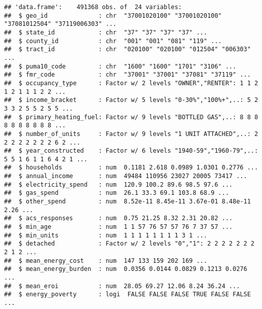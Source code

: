 \documentclass[]{article}
\begin{document}
\begin{verbatim}
## 'data.frame':    491368 obs. of  24 variables:
##  $ geo_id              : chr  "37001020100" "37001020100" "37081012504" "37119006303" ...
##  $ state_id            : chr  "37" "37" "37" "37" ...
##  $ county_id           : chr  "001" "001" "081" "119" ...
##  $ tract_id            : chr  "020100" "020100" "012504" "006303" ...
##  $ puma10_code         : chr  "1600" "1600" "1701" "3106" ...
##  $ fmr_code            : chr  "37001" "37001" "37081" "37119" ...
##  $ occupancy_type      : Factor w/ 2 levels "OWNER","RENTER": 1 1 2 1 2 1 1 1 2 2 ...
##  $ income_bracket      : Factor w/ 5 levels "0-30%","100%+",..: 5 2 3 3 2 5 5 2 5 5 ...
##  $ primary_heating_fuel: Factor w/ 9 levels "BOTTLED GAS",..: 8 8 8 8 8 8 8 8 8 8 ...
##  $ number_of_units     : Factor w/ 9 levels "1 UNIT ATTACHED",..: 2 2 2 2 2 2 2 2 6 2 ...
##  $ year_constructed    : Factor w/ 6 levels "1940-59","1960-79",..: 5 5 1 6 1 1 6 4 2 1 ...
##  $ households          : num  0.1181 2.618 0.0989 1.0301 0.2776 ...
##  $ annual_income       : num  49484 110956 23027 20005 73417 ...
##  $ electricity_spend   : num  120.9 100.2 89.6 98.5 97.6 ...
##  $ gas_spend           : num  26.1 33.3 69.1 103.8 68.9 ...
##  $ other_spend         : num  8.52e-11 8.45e-11 3.67e-01 8.48e-11 2.26 ...
##  $ acs_responses       : num  0.75 21.25 8.32 2.31 20.82 ...
##  $ min_age             : num  1 1 57 76 57 57 76 7 37 57 ...
##  $ min_units           : num  1 1 1 1 1 1 1 1 3 1 ...
##  $ detached            : Factor w/ 2 levels "0","1": 2 2 2 2 2 2 2 2 1 2 ...
##  $ mean_energy_cost    : num  147 133 159 202 169 ...
##  $ mean_energy_burden  : num  0.0356 0.0144 0.0829 0.1213 0.0276 ...
##  $ mean_eroi           : num  28.05 69.27 12.06 8.24 36.24 ...
##  $ energy_poverty      : logi  FALSE FALSE FALSE TRUE FALSE FALSE ...
\end{verbatim}
\end{document}
